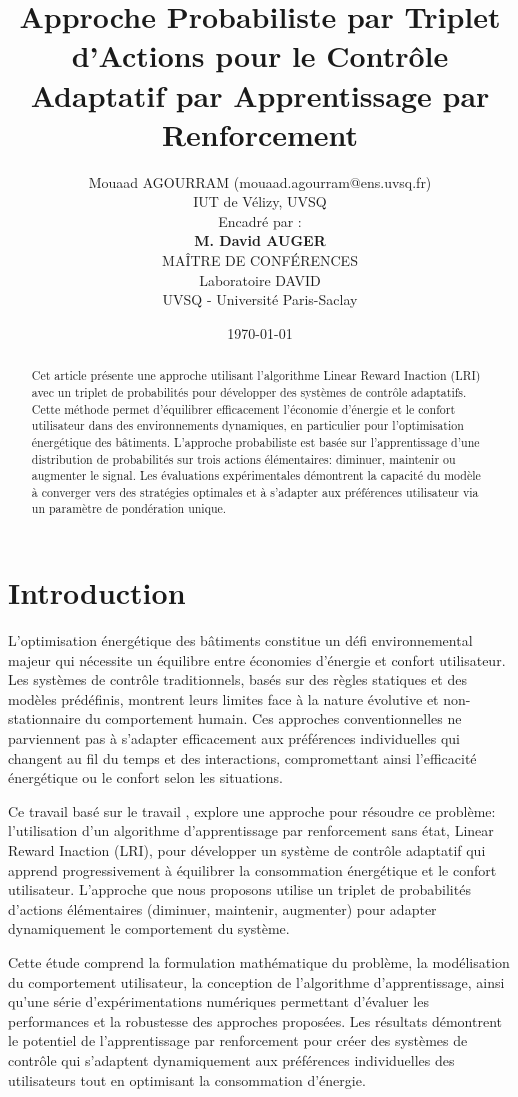 \documentclass[a4paper,11pt]{article}
\title{Approche Probabiliste par Triplet d'Actions pour le Contrôle Adaptatif par Apprentissage par Renforcement}
\author{Mouaad AGOURRAM (\small mouaad.agourram@ens.uvsq.fr) \\
IUT de Vélizy, UVSQ\\ 
  Encadré par :\\
  \textbf{M. David AUGER}
\\
MAÎTRE DE CONFÉRENCES \\
Laboratoire DAVID \\
UVSQ - Université Paris-Saclay\\
}
\date{\today}
\begin{document}
\maketitle
\vspace{3cm}
\begin{abstract}
Cet article présente une approche utilisant l'algorithme Linear Reward Inaction (LRI) avec un triplet de probabilités pour développer des systèmes de contrôle adaptatifs. Cette méthode permet d'équilibrer efficacement l'économie d'énergie et le confort utilisateur dans des environnements dynamiques, en particulier pour l'optimisation énergétique des bâtiments.
 L'approche probabiliste est basée sur l'apprentissage d'une distribution de probabilités sur trois actions élémentaires: diminuer, maintenir ou augmenter le signal. Les évaluations expérimentales démontrent la capacité du modèle à converger vers des stratégies optimales et à s'adapter aux préférences utilisateur via un paramètre de pondération unique.
\end{abstract}

\clearpage
\section{Introduction}
L'optimisation énergétique des bâtiments constitue un défi environnemental majeur qui nécessite un équilibre entre économies d'énergie et confort utilisateur. Les systèmes de contrôle traditionnels, basés sur des règles statiques et des modèles prédéfinis, montrent leurs limites face à la nature évolutive et non-stationnaire du comportement humain. Ces approches conventionnelles ne parviennent pas à s'adapter efficacement aux préférences individuelles qui changent au fil du temps et des interactions, compromettant ainsi l'efficacité énergétique ou le confort selon les situations.

Ce travail basé sur le travail \cite{haddam2022}, explore une approche  pour résoudre ce problème: l'utilisation d'un algorithme d'apprentissage par renforcement sans état, Linear Reward Inaction (LRI), pour développer un système de contrôle adaptatif qui apprend progressivement à équilibrer la consommation énergétique et le confort utilisateur. L'approche que nous proposons utilise un triplet de probabilités d'actions élémentaires (diminuer, maintenir, augmenter) pour adapter dynamiquement le comportement du système.

Cette étude comprend la formulation mathématique du problème, la modélisation du comportement utilisateur, la conception de l'algorithme d'apprentissage, ainsi qu'une série d'expérimentations numériques permettant d'évaluer les performances et la robustesse des approches proposées. Les résultats démontrent le potentiel de l'apprentissage par renforcement pour créer des systèmes de contrôle qui s'adaptent dynamiquement aux préférences individuelles des utilisateurs tout en optimisant la consommation d'énergie.
\end{document}
